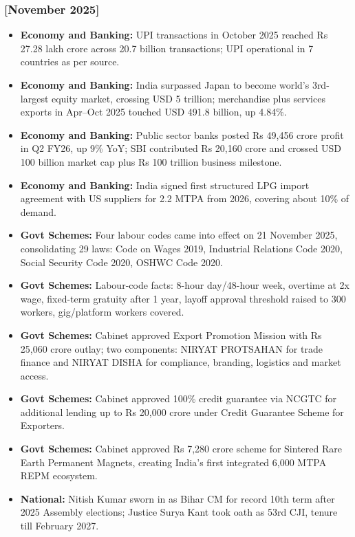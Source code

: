 \documentclass[10pt,a4paper]{article}
\newcommand{\monthtag}[1]{\textbf{[#1]}}
\begin{document}
\subsubsection{\monthtag{November 2025}}
\begin{itemize}
    \item \textbf{Economy and Banking:} UPI transactions in October 2025 reached Rs 27.28 lakh crore across 20.7 billion transactions; UPI operational in 7 countries as per source.
    \item \textbf{Economy and Banking:} India surpassed Japan to become world's 3rd-largest equity market, crossing USD 5 trillion; merchandise plus services exports in Apr--Oct 2025 touched USD 491.8 billion, up 4.84\%.
    \item \textbf{Economy and Banking:} Public sector banks posted Rs 49,456 crore profit in Q2 FY26, up 9\% YoY; SBI contributed Rs 20,160 crore and crossed USD 100 billion market cap plus Rs 100 trillion business milestone.
    \item \textbf{Economy and Banking:} India signed first structured LPG import agreement with US suppliers for 2.2 MTPA from 2026, covering about 10\% of demand.
    \item \textbf{Govt Schemes:} Four labour codes came into effect on 21 November 2025, consolidating 29 laws: Code on Wages 2019, Industrial Relations Code 2020, Social Security Code 2020, OSHWC Code 2020.
    \item \textbf{Govt Schemes:} Labour-code facts: 8-hour day/48-hour week, overtime at 2x wage, fixed-term gratuity after 1 year, layoff approval threshold raised to 300 workers, gig/platform workers covered.
    \item \textbf{Govt Schemes:} Cabinet approved Export Promotion Mission with Rs 25,060 crore outlay; two components: NIRYAT PROTSAHAN for trade finance and NIRYAT DISHA for compliance, branding, logistics and market access.
    \item \textbf{Govt Schemes:} Cabinet approved 100\% credit guarantee via NCGTC for additional lending up to Rs 20,000 crore under Credit Guarantee Scheme for Exporters.
    \item \textbf{Govt Schemes:} Cabinet approved Rs 7,280 crore scheme for Sintered Rare Earth Permanent Magnets, creating India's first integrated 6,000 MTPA REPM ecosystem.
    \item \textbf{National:} Nitish Kumar sworn in as Bihar CM for record 10th term after 2025 Assembly elections; Justice Surya Kant took oath as 53rd CJI, tenure till February 2027.

\end{itemize}
\end{document}
